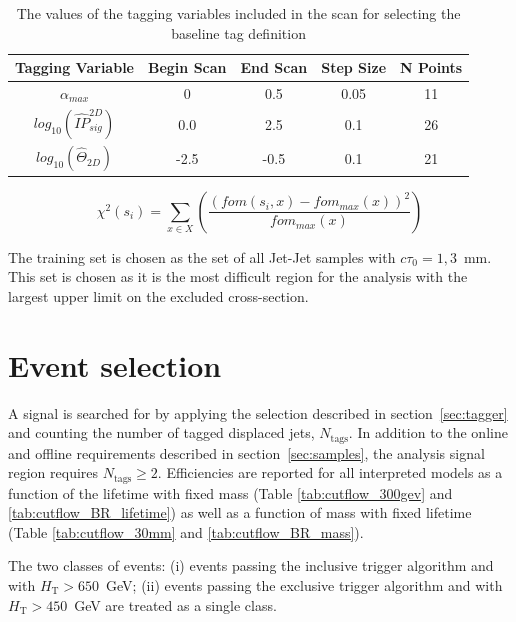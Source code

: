 \begin{table}
\caption{The values of the tagging variables included in the scan for selecting the baseline tag definition  \label{tab:scan_space}}
\begin{center}
\begin{tabular}{ccccc}
\textbf{Tagging Variable} & \textbf{Begin Scan} & \textbf{End Scan} & \textbf{Step Size} & \textbf{N Points}\\
\hline 
$\alpha_{max}$  & 0 &  0.5 & 0.05 & 11\\
$log_{10}(\hat{IP}^{2D}_{sig})$  & 0.0 & 2.5 & 0.1 & 26\\
$log_{10}(\hat{\Theta}_{2D})$  &  -2.5 & -0.5 & 0.1 & 21 \\
\end{tabular}
\end{center}
\end{table}

\begin{equation}
\chi^2(s_i)  =  \sum_{x\in X} \left (\frac{(fom(s_i,x) - fom_{max}(x))^{2}}{ fom_{max}(x)} \right)
\label{eq:fom_opt}
\end{equation}

The training set is chosen as the set of all Jet-Jet samples with $c\tau_0=1,3$~mm. This set is chosen as it is the
 most difficult region for the analysis with the largest upper limit on the excluded cross-section. 

\section{Event selection}


A signal is searched for by applying the selection described in
section~\ref{sec:tagger} and counting the number of tagged displaced
jets, $N_{\textrm{tags}}$.  In addition to the online and offline
requirements described in section~\ref{sec:samples}, the analysis
signal region requires $N_{\textrm{tags}} \geq 2$.  Efficiencies are
reported for all interpreted models as a function of the lifetime with
fixed mass (Table \ref{tab:cutflow_300gev} and
\ref{tab:cutflow_BR_lifetime}) as well as a function of mass with
fixed lifetime (Table \ref{tab:cutflow_30mm} and
\ref{tab:cutflow_BR_mass}).

The two classes of events: (i) events passing the inclusive trigger
algorithm and with $H_{\textrm{T}}>650$~GeV; (ii) events passing the
exclusive trigger algorithm and with $H_{\textrm{T}}>450$~GeV are
treated as a single class.  

